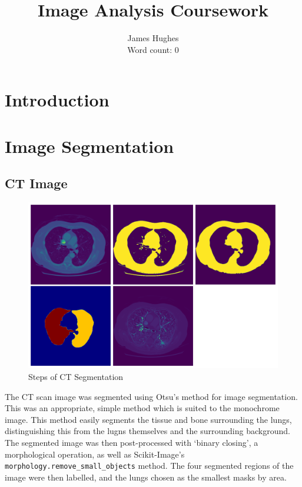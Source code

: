 \documentclass[12pt]{article}
\title{Image Analysis Coursework}
\author{James Hughes\\ Word count: 0}
\begin{document}
\maketitle

\newpage

\tableofcontents

\newpage

\section{Introduction}

\section{Image Segmentation}

\subsection{CT Image}

\begin{figure}[hp]
    \includegraphics[scale=0.35]{figures/ct_segmentation.png}
    \caption{Steps of CT Segmentation}
    \label{fig:ct}
\end{figure}

The CT scan image was segmented using Otsu's method for image segmentation.
This was an appropriate, simple method which is suited to the monochrome image.
This method easily segments the tissue and bone surrounding the lungs,
distinguishing this from the lugns themselves and the surrounding background.
The segmented image was then post-processed with `binary closing', a morphological operation,
as well as Scikit-Image's \texttt{morphology.remove\_small\_objects} method.
The four segmented regions of the image were then labelled, and the lungs chosen as the smallest masks by area.
\end{document}
